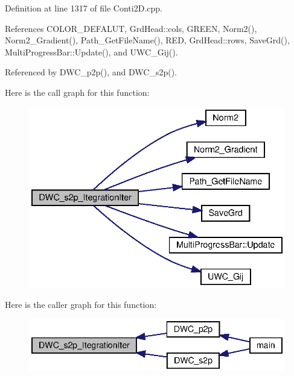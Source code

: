 Definition at line 1317 of file Conti2\+D.\+cpp.



References C\+O\+L\+O\+R\+\_\+\+D\+E\+F\+A\+L\+UT, Grd\+Head\+::cols, G\+R\+E\+EN, Norm2(), Norm2\+\_\+\+Gradient(), Path\+\_\+\+Get\+File\+Name(), R\+ED, Grd\+Head\+::rows, Save\+Grd(), Multi\+Progress\+Bar\+::\+Update(), and U\+W\+C\+\_\+\+Gij().



Referenced by D\+W\+C\+\_\+p2p(), and D\+W\+C\+\_\+s2p().

Here is the call graph for this function\+:
\nopagebreak
\begin{figure}[H]
\begin{center}
\leavevmode
\includegraphics[width=334pt]{Conti2D_8cpp_a0a60bfe4f254fa10e96fabb22a125343_a0a60bfe4f254fa10e96fabb22a125343_cgraph}
\end{center}
\end{figure}
Here is the caller graph for this function\+:\nopagebreak
\begin{figure}[H]
\begin{center}
\leavevmode
\includegraphics[width=339pt]{Conti2D_8cpp_a0a60bfe4f254fa10e96fabb22a125343_a0a60bfe4f254fa10e96fabb22a125343_icgraph}
\end{center}
\end{figure}
\mbox{\label{Conti2D_8cpp_a7730328c8e132ff0a35142a6d31bac18_a7730328c8e132ff0a35142a6d31bac18}} 
